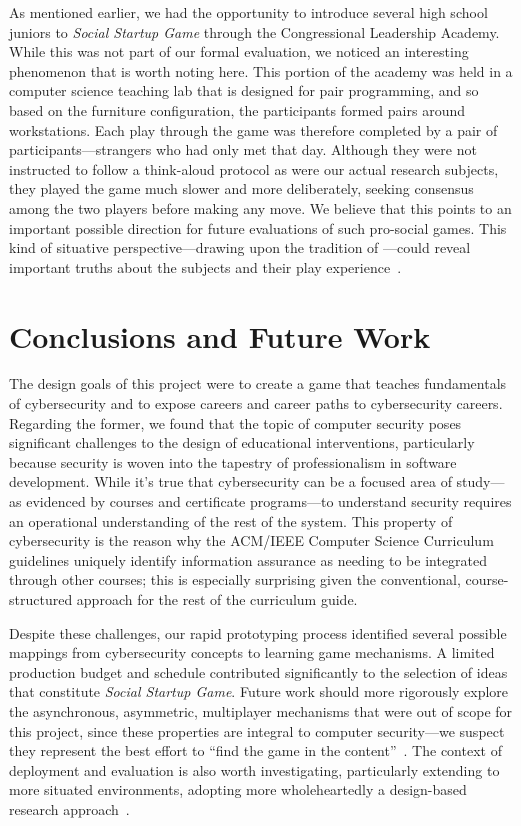 \documentclass[letterpaper]{article}
\begin{document}
As mentioned earlier, we had the opportunity to introduce several
high school juniors to \textit{Social Startup Game} through the 
Congressional Leadership Academy. While this was not part of our
formal evaluation, we noticed an interesting phenomenon that is worth
noting here. This portion of the academy was held in a computer science
teaching lab that is designed for pair programming, and so based on
the furniture configuration, the participants formed pairs around
workstations. Each play through the game was therefore completed
by a pair of participants---strangers who had only met that day.
Although they were not instructed to follow a think-aloud protocol
as were our actual research subjects, they played the game much
slower and more deliberately, seeking consensus among the two players
before making any move. We believe that this points to an important
possible direction for future evaluations of such pro-social games.
This kind of situative perspective---drawing upon the tradition
of \citet{Wenger1999}---could reveal important truths
about the subjects and their play experience~\citep{Hickey2003}.


\section{Conclusions and Future Work}

The design goals of this project were to create a game that teaches
fundamentals of cybersecurity and to expose careers and career paths
to cybersecurity careers.
Regarding the former, we found that the topic of 
computer security poses significant challenges to the design of
educational interventions, particularly because security is woven
into the tapestry of professionalism in software development.
While it's true that cybersecurity can be a focused area of study---as
evidenced by courses and certificate programs---to understand security
requires an operational understanding of the rest of the system.
This property of cybersecurity is the reason why the ACM/IEEE Computer Science
Curriculum guidelines uniquely identify information assurance as needing
to be integrated through other courses; this is especially surprising given
the conventional, course-structured approach for the rest of the curriculum
guide.

Despite these challenges, our rapid prototyping process identified
several possible mappings from cybersecurity concepts to learning game
mechanisms. 
A limited production budget and schedule contributed significantly to the
selection of ideas that constitute \textit{Social Startup Game}.
Future work should more rigorously explore the asynchronous, asymmetric,
multiplayer mechanisms that were out of scope for this project,
since these properties are integral to computer security---we suspect
they represent the best effort to ``find the game in the 
content''~\citep{Klopfer2009}.
The context of deployment and evaluation is also worth investigating,
particularly extending to  more situated environments,
adopting more wholeheartedly a design-based
 research approach~\citep{Brown1992,Barab2004}.
\end{document}
